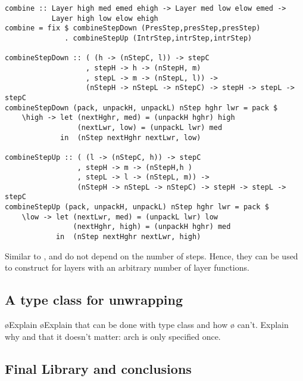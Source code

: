 \documentclass[preprint,natbib]{sigplanconf}
\begin{document}
\begin{small}
\begin{verbatim}
combine :: Layer high med emed ehigh -> Layer med low elow emed -> 
           Layer high low elow ehigh
combine = fix $ combineStepDown (PresStep,presStep,presStep) 
              . combineStepUp (IntrStep,intrStep,intrStep) 

combineStepDown :: ( (h -> (nStepC, l)) -> stepC 
                   , stepH -> h -> (nStepH, m)
                   , stepL -> m -> (nStepL, l)) -> 
                   (nStepH -> nStepL -> nStepC) -> stepH -> stepL -> stepC
combineStepDown (pack, unpackH, unpackL) nStep hghr lwr = pack $
    \high -> let (nextHghr, med) = (unpackH hghr) high
                 (nextLwr, low) = (unpackL lwr) med
             in  (nStep nextHghr nextLwr, low)

combineStepUp :: ( (l -> (nStepC, h)) -> stepC 
                 , stepH -> m -> (nStepH,h )
                 , stepL -> l -> (nStepL, m)) -> 
                 (nStepH -> nStepL -> nStepC) -> stepH -> stepL -> stepC
combineStepUp (pack, unpackH, unpackL) nStep hghr lwr = pack $
    \low -> let (nextLwr, med) = (unpackL lwr) low
                (nextHghr, high) = (unpackH hghr) med
            in  (nStep nextHghr nextLwr, high)
\end{verbatim}%
\end{small}

Similar to ,  and  do not depend on the number of steps. Hence, they can be used to construct  for layers with an arbitrary number of layer functions.

%																
\subsection{A type class for unwrapping}

\bl
\o Explain 
\o Explain that  can be done with type class and how
\o {} can't. Explain why and that it doesn't matter: arch is only specified once.
\el

%																
\subsection{Final Library and conclusions} \label{sect:libAndConclusions}
\end{document}
